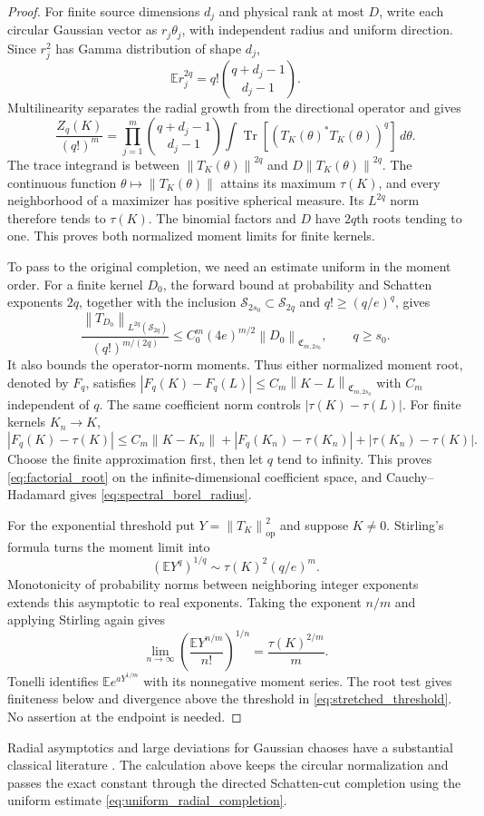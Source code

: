 \documentclass[11pt,a4paper]{amsart}
\numberwithin{equation}{section}
\theoremstyle{definition}
\theoremstyle{remark}
\newcommand{\E}{\mathbb E}
\newcommand{\Sch}{\mathcal S}
\newcommand{\Coeff}{\mathfrak C}
\DeclareMathOperator{\Tr}{Tr}
\newcommand{\op}{\mathrm{op}}
\newcommand{\norm}[1]{\left\lVert#1\right\rVert}
\begin{document}
\begin{proof}
For finite source dimensions $d_j$ and physical rank at most $D$, write each circular Gaussian vector as $r_j\theta_j$, with independent radius and uniform direction. Since $r_j^2$ has Gamma distribution of shape $d_j$,
\[
 \E r_j^{2q}=q!\binom{q+d_j-1}{d_j-1}.
\]
Multilinearity separates the radial growth from the directional operator and gives
\begin{equation}\label{eq:finite_radial_identity}
 \frac{Z_q(K)}{(q!)^m}
 =\prod_{j=1}^m\binom{q+d_j-1}{d_j-1}
   \int\Tr[(T_K(\theta)^*T_K(\theta))^q]\,d\theta.
\end{equation}
The trace integrand is between $\norm{T_K(\theta)}^{2q}$ and $D\norm{T_K(\theta)}^{2q}$. The continuous function $\theta\mapsto\norm{T_K(\theta)}$ attains its maximum $\tau(K)$, and every neighborhood of a maximizer has positive spherical measure. Its $L^{2q}$ norm therefore tends to $\tau(K)$. The binomial factors and $D$ have $2q$th roots tending to one. This proves both normalized moment limits for finite kernels.

To pass to the original completion, we need an estimate uniform in the moment order. For a finite kernel $D_0$, the forward bound at probability and Schatten exponents $2q$, together with the inclusion $\Sch_{2s_0}\subset\Sch_{2q}$ and $q!\ge(q/e)^q$, gives
\begin{equation}\label{eq:uniform_radial_completion}
 \frac{\norm{T_{D_0}}_{L^{2q}(\Sch_{2q})}}{(q!)^{m/(2q)}}
 \le C_0^m(4e)^{m/2}\norm{D_0}_{\Coeff_{m,2s_0}},
 \qquad q\ge s_0.
\end{equation}
It also bounds the operator-norm moments. Thus either normalized moment root, denoted by $F_q$, satisfies
$|F_q(K)-F_q(L)|\le C_m\norm{K-L}_{\Coeff_{m,2s_0}}$
with $C_m$ independent of $q$. The same coefficient norm controls $|\tau(K)-\tau(L)|$. For finite kernels $K_n\to K$,
\[
 |F_q(K)-\tau(K)|
 \le C_m\norm{K-K_n}
 +|F_q(K_n)-\tau(K_n)|+|\tau(K_n)-\tau(K)|.
\]
Choose the finite approximation first, then let $q$ tend to infinity. This proves \eqref{eq:factorial_root} on the infinite-dimensional coefficient space, and Cauchy--Hadamard gives \eqref{eq:spectral_borel_radius}.

For the exponential threshold put $Y=\norm{T_K}_{\op}^2$ and suppose $K\ne0$. Stirling's formula turns the moment limit into
\[
 (\E Y^q)^{1/q}\sim\tau(K)^2(q/e)^m.
\]
Monotonicity of probability norms between neighboring integer exponents extends this asymptotic to real exponents. Taking the exponent $n/m$ and applying Stirling again gives
\[
 \lim_{n\to\infty}\left(\frac{\E Y^{n/m}}{n!}\right)^{1/n}
 =\frac{\tau(K)^{2/m}}m.
\]
Tonelli identifies $\E e^{aY^{1/m}}$ with its nonnegative moment series. The root test gives finiteness below and divergence above the threshold in \eqref{eq:stretched_threshold}. No assertion at the endpoint is needed.
\end{proof}
Radial asymptotics and large deviations for Gaussian chaoses have a substantial classical literature \cite{HKP,Ledoux}. The calculation above keeps the circular normalization and passes the exact constant through the directed Schatten-cut completion using the uniform estimate \eqref{eq:uniform_radial_completion}.
\end{document}
